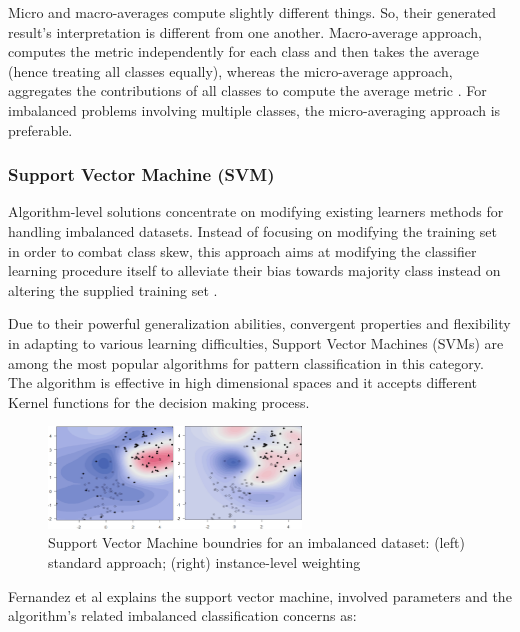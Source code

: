 Micro and macro-averages compute slightly different things. So, their generated result's interpretation is 
different from one another. Macro-average approach, computes the metric independently for each class 
and then takes the average (hence treating all classes equally), whereas the micro-average approach, 
aggregates the contributions of all classes to compute the average metric \cite{sokolova_systematic_2009}. 
For imbalanced problems involving multiple classes, the micro-averaging approach is preferable.


\subsubsection{Support Vector Machine (SVM)}
Algorithm-level solutions concentrate on modifying existing learners methods for handling 
imbalanced datasets. Instead of focusing on modifying the training set in order to combat 
class skew, this approach aims at modifying the classifier learning procedure itself to 
alleviate their bias towards majority class instead on altering the supplied 
training set \cite{krawczyk2016learning}.

Due to their powerful generalization abilities, convergent properties and flexibility in 
adapting to various learning difficulties, Support Vector Machines (SVMs)\cite{vapnik2013nature} 
are among the most popular algorithms for pattern classification in this category. 
The algorithm is effective in high dimensional spaces and it accepts different Kernel 
functions for the decision making process.

\begin{figure}[ht]
    \centering
    \includegraphics[width=0.60\textwidth]{figures/13svmAlgorithm.png}
    \caption{Support Vector Machine boundries for an imbalanced dataset: 
    (left) standard approach; (right) instance-level 
    weighting \cite{fernandez_learning_2018}}
    \label{fig:svmBoundries}
\end{figure}

Fernandez et al \cite{fernandez_learning_2018} explains the support vector machine, involved parameters 
and the algorithm's related imbalanced classification concerns as:

